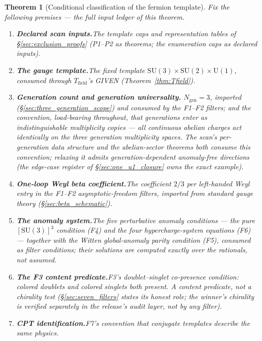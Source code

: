 \documentclass[11pt]{article}
\newtheorem{theorem}{Theorem}[section]
\theoremstyle{definition}
\newcommand{\SU}{\mathrm{SU}}
\newcommand{\U}{\mathrm{U}}
\begin{document}
\begin{theorem}[Conditional classification of the fermion template]
\label{thm:conditional_classification}
Fix the following premises --- the full input ledger of this theorem.
\begin{enumerate}[label=(C\arabic*),nosep]
  \item \textbf{Declared scan inputs.}\quad The template caps and
  representation tables of \S\ref{sec:exclusion_proofs} (P1--P2 as
  theorems; the enumeration caps as declared inputs).
  \item \textbf{The gauge template.}\quad The fixed template
  $\SU(3)\times\SU(2)\times\U(1)$, consumed through
  $T_{\mathrm{field}}$'s GIVEN (Theorem~\ref{thm:Tfield}).
  \item \textbf{Generation count and generation universality.}\quad
  $N_{\mathrm{gen}} = 3$, imported
  (\S\ref{sec:three_generation_scope}) and consumed by the F1--F2
  filters; and the convention, load-bearing throughout, that
  generations enter as indistinguishable multiplicity copies ---
  \emph{all continuous abelian charges act identically on the three
  generation multiplicity spaces}.  The scan's per-generation data
  structure and the abelian-sector theorems both consume this
  convention; relaxing it admits generation-dependent anomaly-free
  directions (the edge-case register of \S\ref{sec:one_u1_closure}
  owns the exact example).
  \item \textbf{One-loop Weyl beta coefficient.}\quad The
  coefficient $2/3$ per left-handed Weyl entry in the F1--F2
  asymptotic-freedom filters, imported from standard gauge theory
  (\S\ref{sec:beta_schematic}).
  \item \textbf{The anomaly system.}\quad The five perturbative
  anomaly conditions --- the pure $[\SU(3)]^3$ condition (F4) and the
  four hypercharge-system equations (F6) --- together with the Witten
  global-anomaly parity condition (F5), consumed as filter conditions; their solutions are
  computed exactly over the rationals, not assumed.
  \item \textbf{The F3 content predicate.}\quad F3's
  doublet--singlet co-presence condition: colored doublets and
  colored singlets both present.  A content predicate, not a
  chirality test (\S\ref{sec:seven_filters} states its honest role;
  the winner's chirality is verified separately in the release's
  audit layer, not by any filter).
  \item \textbf{CPT identification.}\quad F7's convention that
  conjugate templates describe the same physics.

\end{enumerate}
\end{theorem}
\end{document}
